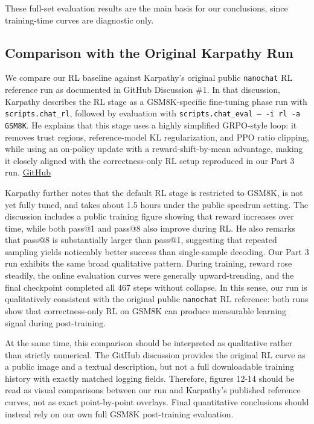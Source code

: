 These full-set evaluation results are the main basis for our conclusions, since training-time curves are diagnostic only.

\subsection{Comparison with the Original Karpathy Run}

We compare our RL baseline against Karpathy’s original public \texttt{nanochat} RL reference run as documented in GitHub Discussion \#1. In that discussion, Karpathy describes the RL stage as a GSM8K-specific fine-tuning phase run with \texttt{scripts.chat\_rl}, followed by evaluation with \texttt{scripts.chat\_eval -- -i rl -a GSM8K}. He explains that this stage uses a highly simplified GRPO-style loop: it removes trust regions, reference-model KL regularization, and PPO ratio clipping, while using an on-policy update with a reward-shift-by-mean advantage, making it closely aligned with the correctness-only RL setup reproduced in our Part 3 run.  \href{https://github.com/karpathy/nanochat/discussions/1}{GitHub}

Karpathy further notes that the default RL stage is restricted to GSM8K, is not yet fully tuned, and takes about 1.5 hours under the public speedrun setting. The discussion includes a public training figure showing that reward increases over time, while both pass@1 and pass@8 also improve during RL. He also remarks that pass@8 is substantially larger than pass@1, suggesting that repeated sampling yields noticeably better success than single-sample decoding.  
Our Part 3 run exhibits the same broad qualitative pattern. During training, reward rose steadily, the online evaluation curves were generally upward-trending, and the final checkpoint completed all 467 steps without collapse. In this sense, our run is qualitatively consistent with the original public \texttt{nanochat} RL reference: both runs show that correctness-only RL on GSM8K can produce measurable learning signal during post-training.  

At the same time, this comparison should be interpreted as qualitative rather than strictly numerical. The GitHub discussion provides the original RL curve as a public image and a textual description, but not a full downloadable training history with exactly matched logging fields. Therefore, figures 12-14 should be read as visual comparisons between our run and Karpathy’s published reference curves, not as exact point-by-point overlays. Final quantitative conclusions should instead rely on our own full GSM8K post-training evaluation.  

